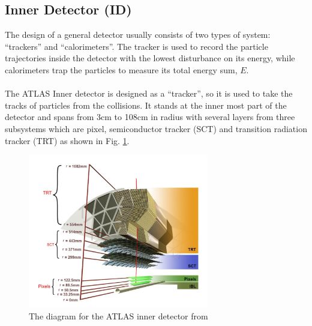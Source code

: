 \subsection{Inner Detector (ID) \cite{CERN-LHCC-97-016}}
The design of a general detector usually consists of two types of system: ``trackers'' and ``calorimeters''. The tracker is used to record the particle trajectories inside the detector with the lowest disturbance on its energy, while calorimeters trap the particles to measure its total energy sum, $E$. 
\\
\\The ATLAS Inner detector is designed as a ``tracker'', so it is used to take the tracks of particles from the collisions. It stands at the inner most part of the detector and spans from 3cm to 108cm in radius with several layers from three subsystems which are pixel, semiconductor tracker (SCT) and transition radiation tracker (TRT) as shown in Fig. \ref{Fig:ID}. 

\begin{figure}[!h]                
	\includegraphics[width=0.7\textwidth]{Chapter2/ID.png}
	\centering
	\begin{center}
		\caption{The diagram for the ATLAS inner detector from \cite{PERF-2015-08}}
		\label{Fig:ID}            
	\end{center}
\end{figure}

